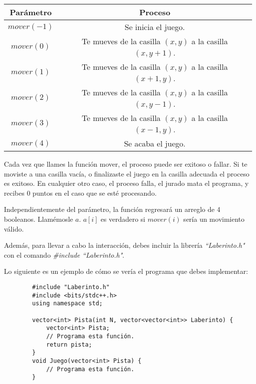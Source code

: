 \documentclass[12pt]{scrartcl}
\begin{document}
    \begin{center}
        \begin{tabular}{|c|c|}
            \hline
            {\bfseries Parámetro} & {\bfseries Proceso}\\
            \hline
             $mover(-1)$ & Se inicia el juego. \\
             \hline
             $mover(0)$ &  Te mueves de la casilla $(x, y)$ a la casilla $(x, y + 1)$. \\
             \hline
             $mover(1)$ & Te mueves de la casilla $(x, y)$ a la casilla $(x + 1, y)$.\\
             \hline
             $mover(2)$ & Te mueves de la casilla $(x, y)$ a la casilla $(x, y - 1)$.\\
             \hline
             $mover(3)$ & Te mueves de la casilla $(x, y)$ a la casilla $(x - 1, y)$.\\
             \hline
             $mover(4)$ & Se acaba el juego.\\
             \hline
        \end{tabular}
    \end{center}

    Cada vez que llames la función mover, el proceso puede ser exitoso o fallar.  Si te moviste a una casilla vacía, o finalizaste el juego en la casilla adecuada el proceso es exitoso. En cualquier otro caso, el proceso falla, el jurado mata el programa, y recibes 0 puntos en el caso que se esté procesando.
    
    
    Independientemente del parámetro, la función regresará  un arreglo de 4 booleanos. Llamémosle $a$. $a[i]$ es verdadero si $mover(i)$ sería un movimiento válido. 

    Además, para llevar a cabo la interacción, debes incluir la librería \textit{``Laberinto.h"} con el comando \textit{\#include ``Laberinto.h"}.
    
    Lo siguiente es un ejemplo de cómo se vería el programa que debes implementar:
    
    \begin{verbatim}
        #include "Laberinto.h"
        #include <bits/stdc++.h>
        using namespace std;
        
        vector<int> Pista(int N, vector<vector<int>> Laberinto) {
            vector<int> Pista;
            // Programa esta función.
            return pista;
        }
        void Juego(vector<int> Pista) {
            // Programa esta función.
        }
        
    \end{verbatim}
\end{document}
